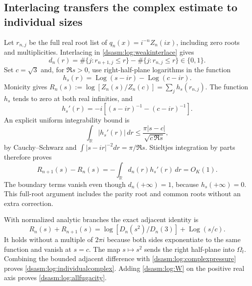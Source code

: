 \documentclass[11pt,letterpaper]{article}
\theoremstyle{remark}\newtheorem{remark}[theorem]{Remark}
\newcommand{\R}{\mathbb R}\newcommand{\C}{\mathbb C}\newcommand{\N}{\mathbb N}
\begin{document}
\subsection{Interlacing transfers the complex estimate to individual sizes}
Let $r_{n,j}$ be the full real root list of
$q_n(x)=i^{-n}Z_n(ix)$, including zero roots and multiplicities.
Interlacing in \eqref{dsasm:log:weakinterlace} gives
\[
 d_n(r)=\#\{j:r_{n+1,j}\le r\}-\#\{j:r_{n,j}\le r\}\in\{0,1\}.
\]
Set $c=\sqrt3$ and, for $\Re s>0$, use right-half-plane logarithms
in the function
\[
 h_s(r)=\operatorname{Log}(s-ir)-\operatorname{Log}(c-ir).
\]
Monicity gives
$R_n(s):=\log[Z_n(s)/Z_n(c)]=\sum_jh_s(r_{n,j})$.
The function $h_s$ tends to zero at both real infinities, and
\[
 h_s'(r)=-i\left[(s-ir)^{-1}-(c-ir)^{-1}\right].
\]
An explicit uniform integrability bound is
\begin{equation}\label{dsasm:log:interlacecomplexbound}
 \int_{\R}|h_s'(r)|\,dr
 \le\frac{\pi|s-c|}{\sqrt{c\,\Re s}},
\end{equation}
by Cauchy--Schwarz and
$\int|s-ir|^{-2}dr=\pi/\Re s$.
Stieltjes integration by parts therefore proves
\[
 R_{n+1}(s)-R_n(s)=-\int_{\R}d_n(r)h_s'(r)\,dr=O_K(1).
\]
The boundary terms vanish even though $d_n(+\infty)=1$, because
$h_s(+\infty)=0$. This full-root argument includes the parity root
and common roots without an extra correction.

With normalized analytic branches the exact adjacent identity is
\[
 R_n(s)+R_{n+1}(s)
 =\log[D_n(s^2)/D_n(3)]+\operatorname{Log}(s/c).
\]
It holds without a multiple of $2\pi i$ because both sides exponentiate
to the same function and vanish at $s=c$. The map $s\mapsto s^2$
sends the right half-plane into $\Omega_t$. Combining the bounded
adjacent difference with \eqref{dsasm:log:complexpressure} proves
\eqref{dsasm:log:individualcomplex}. Adding \eqref{dsasm:log:W} on the positive real
axis proves \eqref{dsasm:log:allfugacity}.
\end{document}
